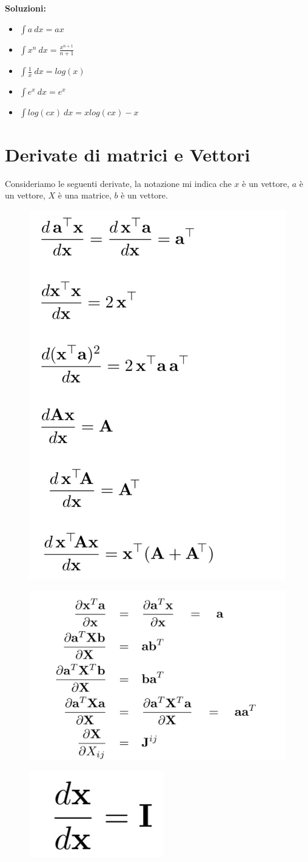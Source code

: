 \documentclass[14pt]{extreport}
\begin{document}
\textbf{Soluzioni:}

\begin{itemize}
	\item $\int a \ dx =ax$
	\item $\int x^n \ dx= \frac{x^{n+1}}{n+1}$
	\item $\int \frac{1}{x} \ dx= log(x)$
	\item $\int e^x\ dx= e^x$
	\item $\int log(cx)\ dx= xlog(cx) - x$
\end{itemize}

\section{Derivate di matrici e Vettori}

Consideriamo le seguenti derivate, la notazione mi indica che $x$ è un vettore, $a$ è un vettore, $X$ è una matrice, $b$ è un vettore.

\begin{figure}[H]
	\centering
	\includegraphics[width=0.4\linewidth]{71.jpeg}
\end{figure}
\begin{figure}[H]
	\centering
	\includegraphics[width=0.7\linewidth]{73.jpeg}
\end{figure}
\begin{figure}[H]
	\centering
	\includegraphics[width=0.2\linewidth]{72.jpeg}
\end{figure}
\end{document}
